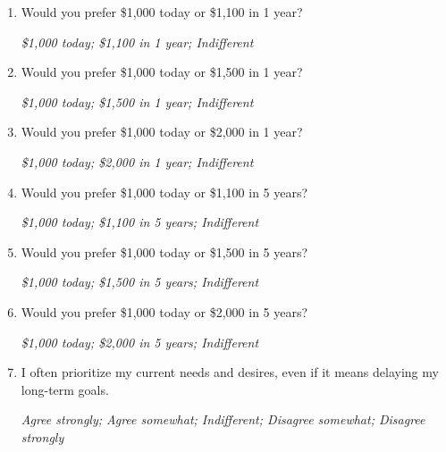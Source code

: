 \documentclass[11pt, headsepline]{article}
\begin{document}
\begin{enumerate}[resume]




    \item Would you prefer \$1,000 today or \$1,100 in 1 year?

    \textit{\$1,000 today; \$1,100 in 1 year; Indifferent}

    \item Would you prefer \$1,000 today or \$1,500 in 1 year?

    \textit{\$1,000 today; \$1,500 in 1 year; Indifferent}

    \item Would you prefer \$1,000 today or \$2,000 in 1 year?

    \textit{\$1,000 today; \$2,000 in 1 year; Indifferent}

    \item Would you prefer \$1,000 today or \$1,100 in 5 years?

    \textit{\$1,000 today; \$1,100 in 5 years; Indifferent}

    \item Would you prefer \$1,000 today or \$1,500 in 5 years?

    \textit{\$1,000 today; \$1,500 in 5 years; Indifferent}

    \item Would you prefer \$1,000 today or \$2,000 in 5 years?

    \textit{\$1,000 today; \$2,000 in 5 years; Indifferent}


    \item I often prioritize my current needs and desires, even if it means delaying my long-term goals.

    \textit{Agree strongly; Agree somewhat; Indifferent; Disagree somewhat; Disagree strongly}
    
\end{enumerate}
\end{document}
